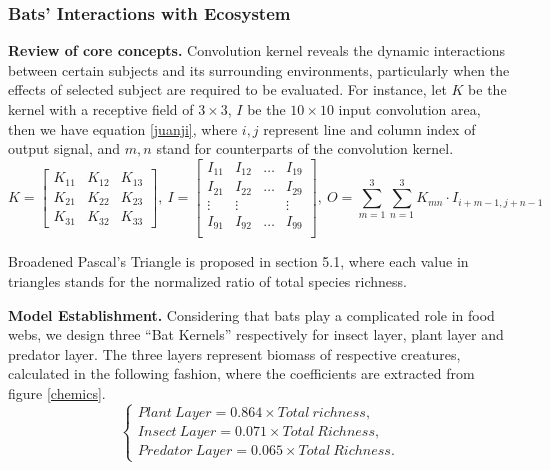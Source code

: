 \documentclass[12pt]{article}
\begin{document}
	\subsubsection{Bats' Interactions with Ecosystem}
	\hspace{1.5em}\textbf{Review of core concepts.} Convolution kernel reveals the dynamic interactions between certain subjects and its surrounding environments, particularly when the effects of selected subject are required to be evaluated. 
	For instance, let $K$ be the kernel with a receptive field of $3\times 3$, $I$ be the $10\times 10$ input convolution area, then we have equation \ref{juanji}, where $i,j$ represent line and column index of output signal, and $m,n$ stand for counterparts of the convolution kernel.  
	\begin{equation}
		K=\begin{bmatrix}
			K_{11} & K_{12} & K_{13} \\
			K_{21} & K_{22} & K_{23} \\
			K_{31} & K_{32} & K_{33} 
		\end{bmatrix},\ I=\begin{bmatrix}
			I_{11} & I_{12} & \dots & I_{19} \\
			I_{21} & I_{22} & \dots & I_{29} \\
			\vdots & \vdots & 		& \vdots \\
			I_{91} & I_{92} & \dots & I_{99} \\
		\end{bmatrix},\ O=\sum_{m=1}^{3}\sum_{n=1}^{3}K_{mn}\cdot I_{i+m-1,j+n-1}
		\label{juanji}
	\end{equation}
	
	
	Broadened Pascal's Triangle is proposed in section 5.1, where each value in triangles stands for the normalized ratio of total species richness.
	
	\textbf{Model Establishment. }Considering that bats play a complicated role in food webs, we design three ``Bat Kernels'' respectively for insect layer, plant layer and predator layer. The three layers represent biomass of respective creatures, calculated in the following fashion, where the coefficients are extracted from figure \ref{chemics}.
	\begin{equation}
		\begin{cases}
			Plant\ Layer = 0.864\times Total\ richness, \\ Insect\ Layer = 0.071\times Total\ Richness, \\ Predator\ Layer = 0.065\times  Total\ Richness.
		\end{cases}\label{ca}
	\end{equation}
	
\end{document}
